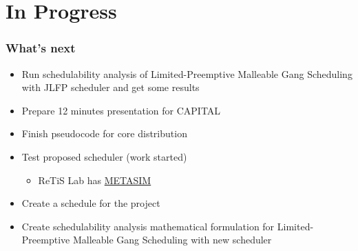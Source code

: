\documentclass[pdf]{beamer}
\begin{document}
\section{In Progress}

\begin{frame}
    \frametitle{What's next}

    \begin{itemize}
        \item Run schedulability analysis of Limited-Preemptive Malleable Gang Scheduling with JLFP scheduler and get some results
        \item Prepare 12 minutes presentation for CAPITAL
        \item Finish pseudocode for core distribution
        \item Test proposed scheduler (work started)
        \begin{itemize}
            \item ReTiS Lab has \href{https://github.com/ReTiS-Lab/METASIM}{METASIM}
        \end{itemize}
        \item Create a schedule for the project
        \item Create schedulability analysis mathematical formulation for Limited-Preemptive Malleable Gang Scheduling with new scheduler
    \end{itemize}
    
\end{frame}
\end{document}
